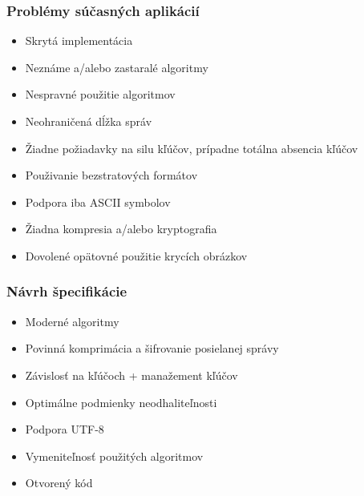 \documentclass{beamer}
\begin{document}
\begin{frame}
    \frametitle{Problémy súčasných aplikácií}
    \begin{itemize}
        \item Skrytá implementácia
        \item Neznáme a/alebo zastaralé algoritmy
        \item Nespravné použitie algoritmov
        \item Neohraničená dĺžka správ
        \item Žiadne požiadavky na silu kľúčov, prípadne totálna absencia kľúčov
        \item Použivanie bezstratových formátov
        \item Podpora iba ASCII symbolov
        \item Žiadna kompresia a/alebo kryptografia
        \item Dovolené opätovné použitie krycích obrázkov
    \end{itemize}
\end{frame}

\begin{frame}
    \frametitle{Návrh špecifikácie}
    \begin{itemize}
        \item Moderné algoritmy
        \item Povinná komprimácia a šifrovanie posielanej správy
        \item Závislosť na kľúčoch + manažement kľúčov
        \item Optimálne podmienky neodhaliteľnosti
        \item Podpora UTF-8
        \item Vymeniteľnosť použitých algoritmov
        \item Otvorený kód
    \end{itemize}
    
\end{frame}
\end{document}
